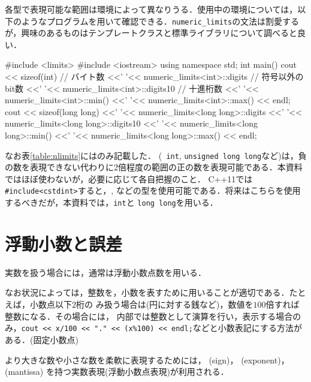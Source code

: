 各型で表現可能な範囲は環境によって異なりうる．使用中の環境については，以下のようなプログラムを用いて確認できる．\texttt{numeric\_limits}の文法は割愛するが，興味のあるものはテンプレートクラスと標準ライブラリについて調べると良い\cite{book:cpp}．
\begin{cbox}[emph={limits}]
#include <limits>
#include <iostream>
using namespace std;
int main() {
  cout << sizeof(int) // バイト数
       <<' '<< numeric_limits<int>::digits // 符号以外のbit数
       <<' '<< numeric_limits<int>::digits10 // 十進桁数
       <<' '<< numeric_limits<int>::min()
       <<' '<< numeric_limits<int>::max()
       << endl;
  cout << sizeof(long long)
       <<' '<< numeric_limits<long long>::digits
       <<' '<< numeric_limits<long long>::digits10
       <<' '<< numeric_limits<long long>::min()
       <<' '<< numeric_limits<long long>::max()
       << endl;
}  
\end{cbox}

なお表\ref{table:nlimits}にはのみ記載した．
(\texttt{ int}, \texttt{unsigned long long}など)は，負の数を表現できない代わりに2倍程度の範囲の正の数を表現可能である．本資料ではほぼ使わないが，必要に応じて各自把握のこと．
C++11では\texttt{\#include<cstdint>}すると，,
などの型を使用可能である．将来はこちらを使用するべきだが，本資料では，\texttt{int}と
\texttt{long long}を用いる．


\section{浮動小数と誤差}\label{section:floating-point-numbers}

実数を扱う場合には，通常は浮動小数点数を用いる．

なお状況によっては，整数を，小数を表すために用いることが適切である．たとえば，小数点以下$2$桁の
み扱う場合は(円に対する銭など)，数値を$100$倍すれば整数になる．その場合には，
内部では整数として演算を行い，表示する場合のみ，\texttt{cout << x/100
  << "." << (x\%100) << endl;}などと小数表記にする方法がある．(固定小数点)

より大きな数や小さな数を柔軟に表現するためには， (sign)， (exponent)，
 (mantissa) を持つ実数表現(浮動小数点表現)が利用される．

